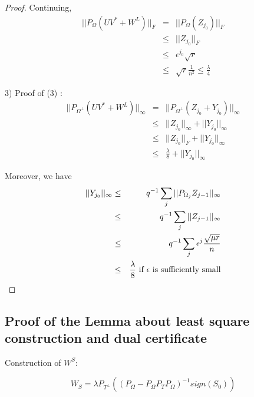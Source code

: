 \documentclass{../common/projectreport}
\begin{document}
\begin{proof}
Continuing, 
\begin{eqnarray*}
||P_{\Omega}(UV^{*}+W^{L})||_{F} & = & ||P_{\Omega}(Z_{j_{0}})||_{F}\\
 & \le & ||Z_{j_{0}}||_{F}\\
 & \le & \epsilon^{j_{0}}\sqrt{r}\\
 & \le & \sqrt{r}\frac{1}{n^{2}}\le\frac{\lambda}{4}
\end{eqnarray*}


3) Proof of (3) : 
\begin{eqnarray*}
||P_{\Omega^{\bot}}(UV^{*}+W^{L})||_{\infty} & = & ||P_{\Omega^{\bot}}(Z_{j_{0}}+Y_{j_{0}})||_{\infty}\\
 & \le & ||Z_{j_{0}}||_{\infty}+||Y_{j_{0}}||_{\infty}\\
 & \le & ||Z_{j_{0}}||_{F}+||Y_{j_{0}}||_{\infty}\\
 & \le & \frac{\lambda}{8}+||Y_{j_{0}}||_{\infty}
\end{eqnarray*}


Moreover, we have 
\begin{eqnarray*}
||Y_{j_{0}}||_{\infty} & \le & q^{-1}\sum_{j}||P_{\Omega_{j}}Z_{j-1}||_{\infty}\\
 & \le & q^{-1}\sum_{j}||Z_{j-1}||_{\infty}\\
 & \le & q^{-1}\sum_{j}\epsilon^{j}\frac{\sqrt{\mu r}}{n}\\
 & \le & \frac{\lambda}{8}\text{ if \ensuremath{\epsilon}\ \text{is sufficiently small}}
\end{eqnarray*}

\end{proof}


\subsection{Proof of the Lemma about least square construction and dual certificate }

Construction of $W^{S}$:

\[
W_{S}=\lambda P_{T^{\bot}}((P_{\Omega}-P_{\Omega}P_{T}P_{\Omega})^{-1}sign(S_{0}))
\]
\end{document}
